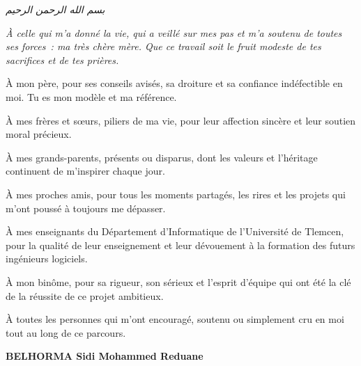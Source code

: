 \newpage
\thispagestyle{empty}

\begin{center}
\textit{\textarabic{بسم الله الرحمن الرحيم}}
\end{center}

\vspace{0.6cm}

{\large\itshape
À celle qui m'a donné la vie, qui a veillé sur mes pas et m'a soutenu de toutes ses forces~: ma très chère mère. Que ce travail soit le fruit modeste de tes sacrifices et de tes prières.

\vspace{0.2cm}

À mon père, pour ses conseils avisés, sa droiture et sa confiance indéfectible en moi. Tu es mon modèle et ma référence.

\vspace{0.2cm}

À mes frères et sœurs, piliers de ma vie, pour leur affection sincère et leur soutien moral précieux.

\vspace{0.2cm}

À mes grands-parents, présents ou disparus, dont les valeurs et l'héritage continuent de m'inspirer chaque jour.

\vspace{0.2cm}

À mes proches amis, pour tous les moments partagés, les rires et les projets qui m'ont poussé à toujours me dépasser.

\vspace{0.2cm}

À mes enseignants du Département d'Informatique de l'Université de Tlemcen, pour la qualité de leur enseignement et leur dévouement à la formation des futurs ingénieurs logiciels.

\vspace{0.2cm}

À mon binôme, pour sa rigueur, son sérieux et l'esprit d'équipe qui ont été la clé de la réussite de ce projet ambitieux.

\vspace{0.2cm}

À toutes les personnes qui m'ont encouragé, soutenu ou simplement cru en moi tout au long de ce parcours.

\vspace{0.6cm}
\hfill\textbf{BELHORMA Sidi Mohammed Reduane}
}
